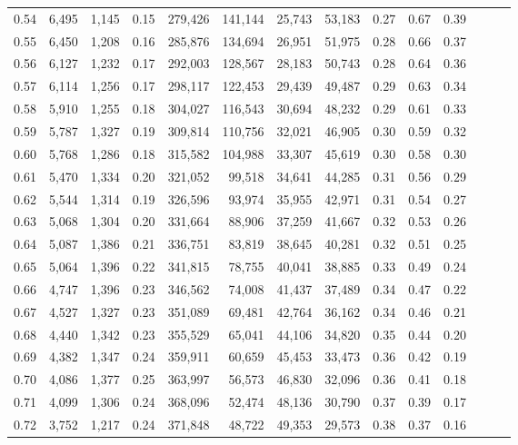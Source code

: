 \begin{tabular}{rrrrrrrrrrrrrr}
0.54 &  6,495 &  1,145 &  0.15 &  279,426 &  141,144 &  25,743 &  53,183 &  0.27 &  0.67 &      0.39 \\
0.55 &  6,450 &  1,208 &  0.16 &  285,876 &  134,694 &  26,951 &  51,975 &  0.28 &  0.66 &      0.37 \\
0.56 &  6,127 &  1,232 &  0.17 &  292,003 &  128,567 &  28,183 &  50,743 &  0.28 &  0.64 &      0.36 \\
0.57 &  6,114 &  1,256 &  0.17 &  298,117 &  122,453 &  29,439 &  49,487 &  0.29 &  0.63 &      0.34 \\
0.58 &  5,910 &  1,255 &  0.18 &  304,027 &  116,543 &  30,694 &  48,232 &  0.29 &  0.61 &      0.33 \\
0.59 &  5,787 &  1,327 &  0.19 &  309,814 &  110,756 &  32,021 &  46,905 &  0.30 &  0.59 &      0.32 \\
0.60 &  5,768 &  1,286 &  0.18 &  315,582 &  104,988 &  33,307 &  45,619 &  0.30 &  0.58 &      0.30 \\
0.61 &  5,470 &  1,334 &  0.20 &  321,052 &   99,518 &  34,641 &  44,285 &  0.31 &  0.56 &      0.29 \\
0.62 &  5,544 &  1,314 &  0.19 &  326,596 &   93,974 &  35,955 &  42,971 &  0.31 &  0.54 &      0.27 \\
0.63 &  5,068 &  1,304 &  0.20 &  331,664 &   88,906 &  37,259 &  41,667 &  0.32 &  0.53 &      0.26 \\
0.64 &  5,087 &  1,386 &  0.21 &  336,751 &   83,819 &  38,645 &  40,281 &  0.32 &  0.51 &      0.25 \\
0.65 &  5,064 &  1,396 &  0.22 &  341,815 &   78,755 &  40,041 &  38,885 &  0.33 &  0.49 &      0.24 \\
0.66 &  4,747 &  1,396 &  0.23 &  346,562 &   74,008 &  41,437 &  37,489 &  0.34 &  0.47 &      0.22 \\
0.67 &  4,527 &  1,327 &  0.23 &  351,089 &   69,481 &  42,764 &  36,162 &  0.34 &  0.46 &      0.21 \\
0.68 &  4,440 &  1,342 &  0.23 &  355,529 &   65,041 &  44,106 &  34,820 &  0.35 &  0.44 &      0.20 \\
0.69 &  4,382 &  1,347 &  0.24 &  359,911 &   60,659 &  45,453 &  33,473 &  0.36 &  0.42 &      0.19 \\
0.70 &  4,086 &  1,377 &  0.25 &  363,997 &   56,573 &  46,830 &  32,096 &  0.36 &  0.41 &      0.18 \\
0.71 &  4,099 &  1,306 &  0.24 &  368,096 &   52,474 &  48,136 &  30,790 &  0.37 &  0.39 &      0.17 \\
0.72 &  3,752 &  1,217 &  0.24 &  371,848 &   48,722 &  49,353 &  29,573 &  0.38 &  0.37 &      0.16 \\

\end{tabular}
